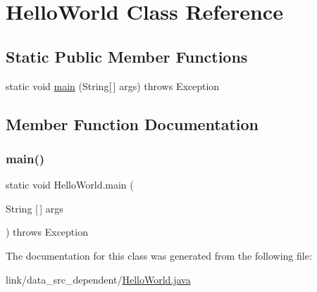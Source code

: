\hypertarget{class_hello_world}{}\section{Hello\+World Class Reference}
\label{class_hello_world}
\subsection*{Static Public Member Functions}
\begin{DoxyCompactItemize}
\item 
static void \hyperlink{class_hello_world_a6ee4fcc2452e2a85be43984f46aceba7}{main} (String\mbox{[}$\,$\mbox{]} args)  throws Exception    
\end{DoxyCompactItemize}


\subsection{Member Function Documentation}
\hypertarget{class_hello_world_a6ee4fcc2452e2a85be43984f46aceba7}{}\label{class_hello_world_a6ee4fcc2452e2a85be43984f46aceba7} 
\subsubsection{\texorpdfstring{main()}{main()}}
{\footnotesize\ttfamily static void Hello\+World.\+main (\begin{DoxyParamCaption}\item[{String \mbox{[}$\,$\mbox{]}}]{args }\end{DoxyParamCaption}) throws Exception\hspace{0.3cm}{\ttfamily [static]}}



The documentation for this class was generated from the following file\+:\begin{DoxyCompactItemize}
\item 
link/data\+\_\+src\+\_\+dependent/\hyperlink{_hello_world_8java}{Hello\+World.\+java}\end{DoxyCompactItemize}
